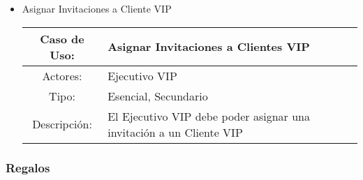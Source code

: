 \begin{itemize}
	\item Asignar Invitaciones a Cliente VIP\\
		\begin{tabular}{|c|p{11cm}|}\hline
			Caso de Uso: & Asignar Invitaciones a Clientes VIP\\\hline
			Actores: &Ejecutivo VIP\\\hline
			Tipo: & Esencial, Secundario\\\hline
			Descripción: &El Ejecutivo VIP debe poder asignar una invitación a un Cliente VIP\\\hline
		\end{tabular}

\end{itemize}
\subsubsection{Regalos}

